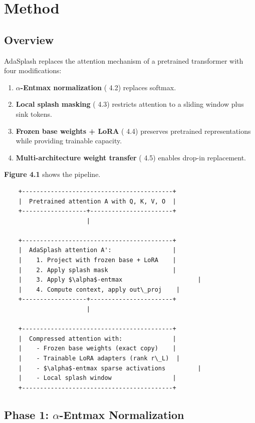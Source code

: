 
\section{Method}

\subsection{Overview}

AdaSplash replaces the attention mechanism of a pretrained transformer with 
four modifications:

\begin{enumerate}
\item \textbf{$\alpha$-Entmax normalization} ( 4.2) replaces softmax.
\item \textbf{Local splash masking} ( 4.3) restricts attention to a sliding window
  plus sink tokens.
\item \textbf{Frozen base weights + LoRA} ( 4.4) preserves pretrained representations
  while providing trainable capacity.
\item \textbf{Multi-architecture weight transfer} ( 4.5) enables drop-in replacement.

\end{enumerate}
\textbf{Figure 4.1} shows the pipeline.

\begin{lstlisting}
    +------------------------------------------+
    |  Pretrained attention A with Q, K, V, O  |
    +------------------+-----------------------+
                       |
                        
    +------------------------------------------+
    |  AdaSplash attention A':                 |
    |    1. Project with frozen base + LoRA    |
    |    2. Apply splash mask                  |
    |    3. Apply $\alpha$-entmax                     |
    |    4. Compute context, apply out\_proj    |
    +------------------+-----------------------+
                       |
                        
    +------------------------------------------+
    |  Compressed attention with:              |
    |    - Frozen base weights (exact copy)    |
    |    - Trainable LoRA adapters (rank r\_L)  |
    |    - $\alpha$-entmax sparse activations         |
    |    - Local splash window                 |
    +------------------------------------------+
\end{lstlisting}

\subsection{Phase 1: $\alpha$-Entmax Normalization}

